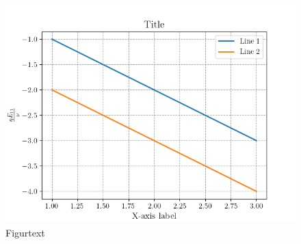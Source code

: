 \documentclass[10pt,1p,sort&compress]{elsarticle}
\begin{document}
\begin{figure}
\centering 
\includegraphics[width=1\textwidth]{results/plot.png}
\caption{Figurtext}
\label{fig:"label"} 
\end{figure}
\end{document}
